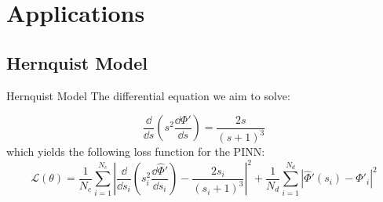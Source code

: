 \section{Applications}\label{ch:applications}


\subsection{Hernquist Model}\label{sec:hernquist}

\begin{frame}{Hernquist Model}
        The differential equation  we aim to solve:

    \begin{equation*}
        \dfrac{\dd}{\dd s}\left(s^2 \dfrac{\dd \Phi'}{\dd s}\right) = \dfrac{2s}{(s+1)^3}
    \end{equation*} which yields the following loss function for the PINN:
    \begin{equation*}
            \mathcal{L}(\theta) = \dfrac{1}{N_c}\sum^{N_c}_{i=1} \left|\dfrac{\dd}{\dd s_i}\left(s_{i}^{2} \dfrac{\dd \hat{\Phi}'}{\dd s_i}\right) - \dfrac{2s_i}{(s_i+1)^3} \right|^2 + \dfrac{1}{N_d}\sum^{N_d}_{i=1} \left|\hat{\Phi}'(s_i) - \Phi'_i \right|^2
    \end{equation*}
\end{frame}

